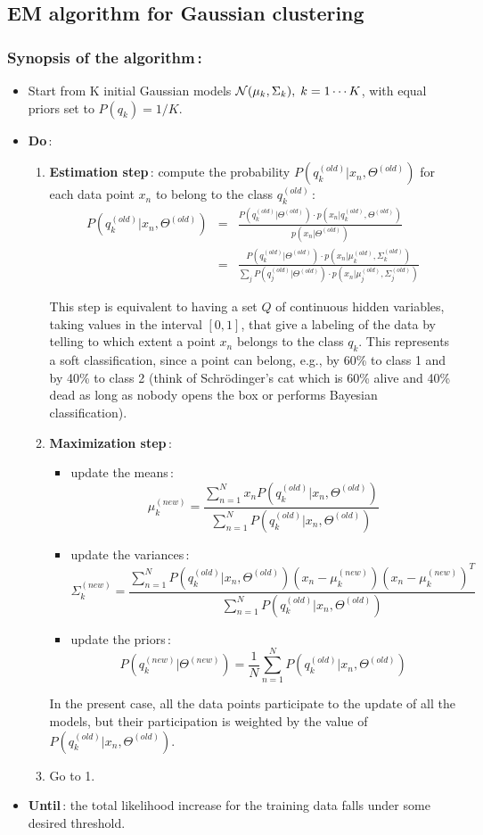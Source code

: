 \documentclass[twoside,a4paper,titlepage]{article}
\begin{document}
\pagebreak
\subsection{EM algorithm for Gaussian clustering}
\subsubsection*{Synopsis of the algorithm\,:}
\begin{itemize}
\item Start from K initial Gaussian models ${\cal N}(\mu_{k},\Sigma_{k}),
\; k=1\cdots K$, with equal priors set to $P(q_k) = 1/K$.
\item {\bf Do}\,:
\begin{enumerate}
\item {\bf Estimation step}\,: compute the probability $P(q_k^{(old)}|x_n,\Theta^{(old)})$ for
each data point $x_n$ to belong to the class $q_k^{(old)}$\,:
%
\begin{eqnarray}
P(q_k^{(old)}|x_n,\Theta^{(old)}) & = & \frac{P(q_k^{(old)}|\Theta^{(old)})
										\cdot p(x_n|q_k^{(old)},\Theta^{(old)})}
										{p(x_n|\Theta^{(old)})} \nonumber \\
           & = & \frac{P(q_k^{(old)}|\Theta^{(old)}) \cdot p(x_n|\mu_k^{(old)},\Sigma_k^{(old)}) }
                      {\sum_j P(q_j^{(old)}|\Theta^{(old)}) \cdot p(x_n|\mu_j^{(old)},\Sigma_j^{(old)}) }
      \nonumber 
\end{eqnarray}

This step is equivalent to having a set $Q$ of continuous hidden variables,
taking values in the interval $[0,1]$, that give a labeling of the data by
telling to which extent a point $x_n$ belongs to the class $q_k$. This
represents a soft classification, since a point can belong, e.g., by 60\%
to class 1 and by 40\% to class 2 (think of Schr\"odinger's cat which is
60\% alive and 40\% dead as long as nobody opens the box or performs
Bayesian classification).
%
\item {\bf Maximization step}\,:
	\begin{itemize}
	\item update the means\,:
		\[\mu_{k}^{(new)} = \frac{\sum_{n=1}^{N} x_n P(q_k^{(old)}|x_n,\Theta^{(old)})}
								  {\sum_{n=1}^{N} P(q_k^{(old)}|x_n,\Theta^{(old)})} \]
	\item update the variances\,:
		\[\Sigma_{k}^{(new)} = \frac{\sum_{n=1}^{N} P(q_k^{(old)}|x_n,\Theta^{(old)})
								(x_n - \mu_k^{(new)})(x_n - \mu_k^{(new)})^T }
							    {\sum_{n=1}^{N} P(q_k^{(old)}|x_n,\Theta^{(old)})} \]
	\item update the priors\,:
		\[ P(q_k^{(new)}|\Theta^{(new)}) = \frac{1}{N} \sum_{n=1}^{N} P(q_k^{(old)}|x_n,\Theta^{(old)}) \]
	\end{itemize}
%
In the present case, all the data points participate to the update of all
the models, but their participation is weighted by the value of
$P(q_k^{(old)}|x_n,\Theta^{(old)})$.
\item Go to 1.
\end{enumerate}
\item {\bf Until}\,: the total likelihood increase for the training data
falls under some desired threshold.
\end{itemize}
\end{document}
